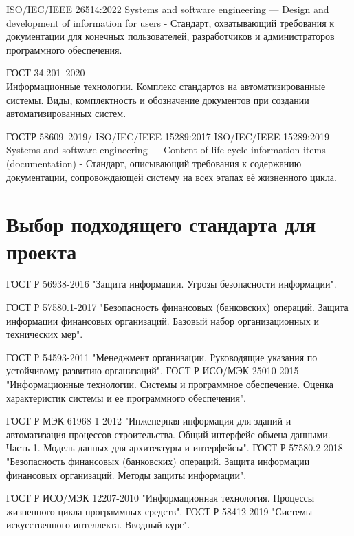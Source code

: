 ISO/IEC/IEEE 26514:2022
Systems and software engineering — Design and development of information for users
     - Стандарт, охватывающий требования к документации для конечных пользователей, разработчиков и администраторов программного обеспечения.

ГОСТ 34.201--2020\\
Информационные технологии.
Комплекс стандартов на автоматизированные системы.
Виды, комплектность и обозначение документов
при создании автоматизированных систем.


ГОСТР 58609--2019/ ISO/IEC/IEEE 15289:2017
ISO/IEC/IEEE 15289:2019
Systems and software engineering — Content of life-cycle information items (documentation)
     - Стандарт, описывающий требования к содержанию документации, сопровождающей систему на всех этапах её жизненного цикла.


\section{Выбор подходящего стандарта для проекта}

\break

ГОСТ Р 56938-2016 "Защита информации. Угрозы безопасности информации".

ГОСТ Р 57580.1-2017 "Безопасность финансовых (банковских) операций. Защита информации финансовых организаций. Базовый набор организационных и технических мер".

ГОСТ Р 54593-2011 "Менеджмент организации. Руководящие указания по устойчивому развитию организаций".
ГОСТ Р ИСО/МЭК 25010-2015 "Информационные технологии. Системы и программное обеспечение. Оценка характеристик системы и ее программного обеспечения".

ГОСТ Р МЭК 61968-1-2012 "Инженерная информация для зданий и автоматизация процессов строительства. Общий интерфейс обмена данными. Часть 1. Модель данных для архитектуры и интерфейсы".
ГОСТ Р 57580.2-2018 "Безопасность финансовых (банковских) операций. Защита информации финансовых организаций. Методы защиты информации".

ГОСТ Р ИСО/МЭК 12207-2010 "Информационная технология. Процессы жизненного цикла программных средств".
ГОСТ Р 58412-2019 "Системы искусственного интеллекта. Вводный курс".

